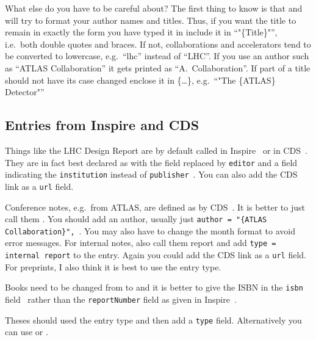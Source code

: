What else do you have to be careful about? The first thing to know is
that  and \BibTeX{} will try to format your author
names and titles. Thus, if you want the title to remain in exactly the
form you have typed it in include it in \enquote{"\{Title\}"}, %
i.e.\ both double quotes and braces. If not, collaborations and accelerators
tend to be converted to lowercase, e.g.\ \enquote{lhc} instead of
\enquote{LHC}. If you use an author such as ``ATLAS Collaboration'' it
gets printed as \enquote{A.\ Collaboration}.
If part of a title should not have its case changed enclose it in \{\ldots\},
e.g.\ \enquote{"The \{ATLAS\} Detector"} %


\subsection{Entries from Inspire and CDS}%
%
\label{sec:ref:cds}

Things like the LHC Design Report are by default
called  in Inspire~\cite{Bruning:2004ej-inspire} or
 in CDS~\cite{Bruening:782076-CDS}. They are in fact
best declared as  with the  field
replaced by \texttt{editor} and a field indicating the
\texttt{institution} instead of
\texttt{publisher}~\cite{lhc:vol1-final}. You can also add the CDS
link as a \texttt{url} field.

Conference notes, e.g.\ from ATLAS, are defined
as  by CDS~\cite{ATLAS-CONF-2011-008-CDS}. It is
better to just call them . You should add an author,
usually just
\texttt{author = "\{ATLAS Collaboration\}",}~\cite{ATLAS-CONF-2011-008-final}. %
You may also have to change the month format to avoid error messages.
For internal notes, also call them report and add \texttt{type = {internal report}}
to the entry. Again you could add the CDS link as a \texttt{url}
field. For preprints, I also think it is best to use
the  entry type.

Books need to be changed from  to
 and it is better to give the ISBN in the \texttt{isbn}
field~\cite{Halzen:1984mc-final} rather than the \texttt{reportNumber}
field as given in Inspire~\cite{Halzen:1984mc-inspire}.

Theses should used the  entry type and
then add a \texttt{type} field. Alternatively you can use
 or .

